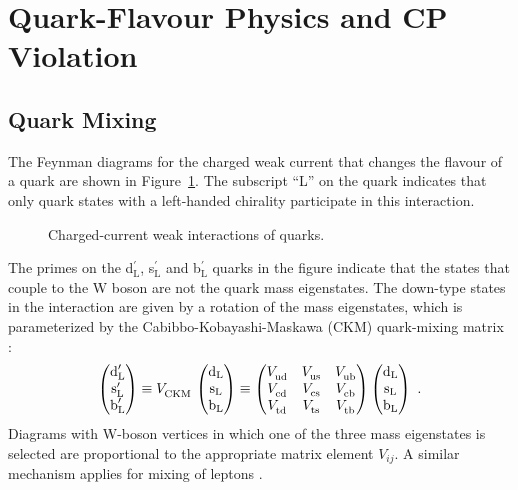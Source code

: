\section{Quark-Flavour Physics and CP Violation}
\label{sec:intro_CPV}

\subsection{Quark Mixing}
\label{subsec:intro_mixCPV_mix}

The Feynman diagrams for the charged weak current that changes the flavour of a quark are shown in Figure~\ref{fig:WCouplings}. The
subscript ``L'' on the quark indicates that only quark states with a left-handed chirality participate in this interaction.
\begin{figure}[hbt]
  
  \caption{Charged-current weak interactions of quarks.}
  \label{fig:WCouplings}
\end{figure}

The primes on the d$_\text{L}^\prime$, s$_\text{L}^\prime$ and b$_\text{L}^\prime$ quarks in the figure indicate that the states that
couple to the W boson are not the quark mass eigenstates. The down-type states in the interaction are given by a rotation of the mass
eigenstates, which is parameterized by the Cabibbo-Kobayashi-Maskawa (CKM) quark-mixing matrix \cite{Kobayashi:1973fv}:
\begin{equation}
  \begin{pmatrix} \text{d}_\text{L}^\prime \\ \text{s}_\text{L}^\prime \\ \text{b}_\text{L}^\prime \end{pmatrix}
    \equiv \VCKM\, \begin{pmatrix} \text{d}_\text{L} \\ \text{s}_\text{L} \\ \text{b}_\text{L} \end{pmatrix}
    \equiv \begin{pmatrix} \Vud & \Vus & \Vub \\ \Vcd & \Vcs & \Vcb \\ \Vtd & \Vts & \Vtb \end{pmatrix}
           \begin{pmatrix} \text{d}_\text{L} \\ \text{s}_\text{L} \\ \text{b}_\text{L} \end{pmatrix}
    \ .
\end{equation}
Diagrams with W-boson vertices in which one of the three mass eigenstates is selected are proportional to the appropriate matrix element
$V_{ij}$. A similar mechanism applies for mixing of leptons \cite{Pontecorvo:1957cp,*Pontecorvo:1957qd,*Maki:1962mu,*Pontecorvo:1967fh}.

